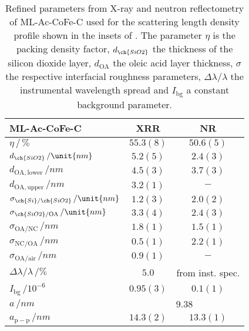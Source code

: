 \documentclass[\main/dresen_thesis.tex]{subfiles}
\begin{document}
  \begin{table}[!htbp]
    \centering
    \caption{\label{tab:monolayers:structure:ML-Ac-CoFe-C-WithSpacer}Refined parameters from X-ray and neutron reflectometry of ML-Ac-CoFe-C used for the scattering length density profile shown in the insets of . The parameter $\eta$ is the packing density factor, $d_{\ch{SiO2}}$ the thickness of the silicon dioxide layer, $d_{\mathrm{OA}}$ the oleic acid layer thickness, $\sigma$ the respective interfacial roughness parameters, $\Delta \lambda / \lambda$ the instrumental wavelength spread and $I_\mathrm{bg}$ a constant background parameter.}
    \begin{tabular}{l | c | c}
      \hline
      ML-Ac-CoFe-C & \textbf{XRR} & \textbf{NR}\\
      \hline
      $\eta \, /\, \%$                               & $55.3(8)$  & $50.6(5)$  \\
      $d_{\ch{SiO2}} \, / \unit{nm}$                 & $5.2(5)$   & $2.4(3)$  \\
      $d_{\mathrm{OA, lower}} \, / \unit{nm}$        & $4.5(3)$   & $3.7(3)$  \\
      $d_{\mathrm{OA, upper}} \, / \unit{nm}$        & $3.2(1)$   & $-$  \\
      $\sigma_{\ch{Si}/\ch{SiO2}} \, / \unit{nm}$    & $1.2(3)$   & $2.0(2)$  \\
      $\sigma_{\ch{SiO2}/\mathrm{OA}}\, / \unit{nm}$ & $3.3(4)$   & $2.4(3)$  \\
      $\sigma_\mathrm{OA/NC} \, / \unit{nm}$         & $1.8(1)$   & $1.5(1)$  \\
      $\sigma_\mathrm{NC/OA} \, / \unit{nm}$         & $0.5(1)$   & $2.2(1)$  \\
      $\sigma_\mathrm{OA/air} \, / \unit{nm}$        & $0.9(1)$   & $-$  \\
      $\Delta \lambda / \lambda \, / \unit{\%}$      & $5.0 $     & from inst. spec.\\
      $I_\mathrm{bg}\,/\unit{10^{-6}}$               & $0.95(3)$  & $0.1(1)$\\
      \hline
      $a \, / \unit{nm}$                             & \multicolumn{2}{c}{$9.38$} \\
      \hline
      $a_\mathrm{p-p} \, / \unit{nm}$                & $14.3(2)$     & $13.3(1)$ \\
      \hline
    \end{tabular}
  \end{table}
\end{document}
